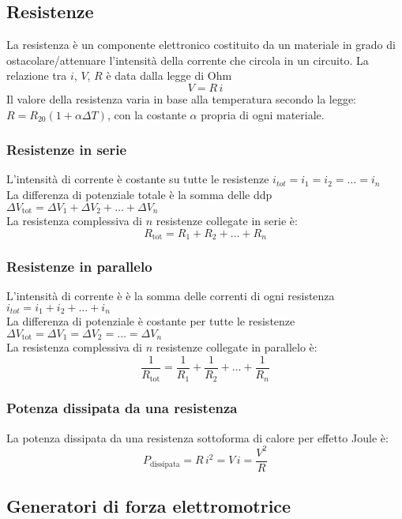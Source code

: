 \documentclass[a4paper]{article}
\begin{document}
\subsection{Resistenze}
La resistenza è un componente elettronico costituito da un materiale in grado di ostacolare/attenuare l'intensità della corrente
che circola in un circuito. La relazione tra \(i\), \(V\), \(R\) è data dalla legge di Ohm \[V = R \, i\]
Il valore della resistenza varia in base alla temperatura secondo la legge: \(R = R_{20} (1 + \alpha \Delta T)\), con la costante
\(\alpha\) propria di ogni materiale.

\subsubsection*{Resistenze in serie}
L'intensità di corrente è costante su tutte le resistenze \(i_{tot} = i_1 = i_2 = \dots = i_n\) \\
La differenza di potenziale totale è la somma delle ddp \(\Delta V_\text{tot} = \Delta V_1 + \Delta V_2 + \dots + \Delta V_n\) \\
La resistenza complessiva di \(n\) resistenze collegate in serie è:
\[R_\text{tot} = R_1 + R_2 + \dots + R_n\]

\subsubsection*{Resistenze in parallelo}
L'intensità di corrente è è la somma delle correnti di ogni resistenza \(i_{tot} = i_1 + i_2 + \dots + i_n\) \\
La differenza di potenziale è costante per tutte le resistenze \(\Delta V_\text{tot} = \Delta V_1 = \Delta V_2 = \dots = \Delta V_n\) \\
La resistenza complessiva di \(n\) resistenze collegate in parallelo è:
\[\frac{1}{R_\text{tot}} = \frac{1}{R_1}+ \frac{1}{R_2} + \dots + \frac{1}{R_n}\]

\subsubsection*{Potenza dissipata da una resistenza}
La potenza dissipata da una resistenza sottoforma di calore per effetto Joule è:
\[P_\text{dissipata} = R \, i^2 = V \, i = \frac{V^2}{R}\]

\newpage

\subsection{Generatori di forza elettromotrice}
\end{document}
